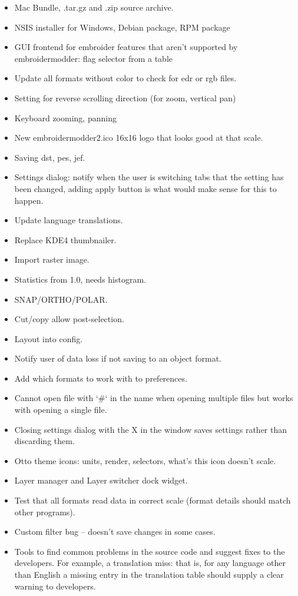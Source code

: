 \documentclass[a4paper]{report}
\begin{document}
\begin{itemize}
  \item Mac Bundle, .tar.gz and .zip source archive.
  \item NSIS installer for Windows, Debian package, RPM package
  \item GUI frontend for embroider features that aren't supported by embroidermodder: flag selector from a table
  \item Update all formats without color to check for edr or rgb files.
  \item Setting for reverse scrolling direction (for zoom, vertical pan)
  \item Keyboard zooming, panning
  \item New embroidermodder2.ico 16x16 logo that looks good at that scale.
  \item Saving dst, pes, jef.
  \item Settings dialog: notify when the user is switching tabs that the setting has been changed, adding apply button is what would make sense for this to happen.
  \item Update language translations.
  \item Replace KDE4 thumbnailer.
  \item Import raster image.
  \item Statistics from 1.0, needs histogram.
  \item SNAP/ORTHO/POLAR.
  \item Cut/copy allow post-selection.
  \item Layout into config.
  \item Notify user of data loss if not saving to an object format.
  \item Add which formats to work with to preferences.
  \item Cannot open file with `\#` in the name when opening multiple files but works with opening a single file.
  \item Closing settings dialog with the X in the window saves settings rather than discarding them.
  \item Otto theme icons: units, render, selectors, what's this icon doesn't scale.
  \item Layer manager and Layer switcher dock widget.
  \item Test that all formats read data in correct scale (format details should match other programs).
  \item Custom filter bug -- doesn't save changes in some cases.
  \item Tools to find common problems in the source code and suggest fixes to the developers. For example, a translation miss: that is, for any language other than English a missing entry in the translation table should supply a clear warning to developers.

\end{itemize}
\end{document}
